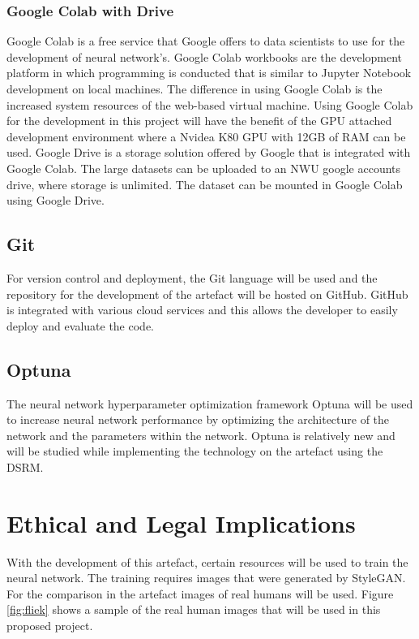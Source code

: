 \subsubsection{Google Colab with Drive}

Google Colab is a free service that Google offers to data scientists to use for the development of neural network's. Google Colab workbooks are the development platform in which programming is conducted that is similar to Jupyter Notebook development on local machines. The difference in using Google Colab is the increased system resources of the web-based virtual machine. Using Google Colab for the development in this project will have the benefit of the GPU attached development environment where a Nvidea K80 GPU with 12GB of RAM can be used. Google Drive is a storage solution offered by Google that is integrated with Google Colab. The large datasets can be uploaded to an NWU google accounts drive, where storage is unlimited. The dataset can be mounted in Google Colab using Google Drive.

\subsection{Git}

For version control and deployment, the Git language will be used and the repository for the development of the artefact will be hosted on GitHub. GitHub is integrated with various cloud services and this allows the developer to easily deploy and evaluate the code.

\subsection{Optuna}

The neural network hyperparameter optimization framework Optuna will be used to increase neural network performance  by optimizing the architecture of the network and the parameters within the network. Optuna is relatively new and will be studied while implementing the technology on the artefact using the DSRM.

\section{Ethical and Legal Implications}

With the development of this artefact, certain resources will be used to train the neural network. The training requires images that were generated by StyleGAN. For the comparison in the artefact images of real humans will be used. Figure \ref{fig:fliek} shows a sample of the real human images that will be used in this proposed project.


